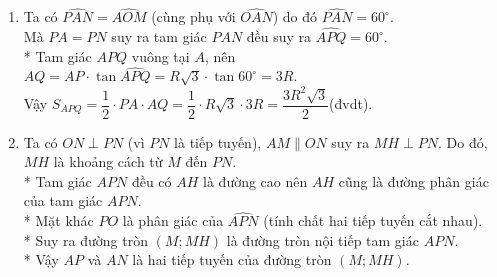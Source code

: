 \begin{bt}
{\begin{enumerate}
			Vậy $AM\parallel ON$.\\*
			Ta có $AP\perp OA$ (vì $AP$ là tiếp tuyến)
			$\Rightarrow \widehat{OAP}=90^\circ$.\\*
			Tam giác $PAO$ vuông tại $A$ nên $AP=OA\cdot
			\tan\widehat{AOP}=R\cdot \tan60^\circ=R\sqrt{3}$.
			\item Ta có $\widehat{PAN}=\widehat{AOM}$ (cùng phụ với $\widehat{OAN}$) do đó $\widehat{PAN}=60^\circ$.\\
			Mà $PA=PN$ suy ra tam giác $PAN$ đều suy ra $\widehat{APQ}=60^\circ$.\\*
			Tam giác $APQ$ vuông tại $A$, nên $AQ=AP\cdot \tan\widehat{APQ}=R\sqrt{3}\cdot \tan60^\circ=3R$.\\
			Vậy $S_{APQ}=\dfrac{1}{2}\cdot PA\cdot AQ=\dfrac{1}{2}\cdot R\sqrt{3}\cdot 3R=\dfrac{3R^{2}\sqrt{3}}{2}$(đvdt).
			\item Ta có $ON\perp PN$ (vì $PN$ là tiếp tuyến), $AM\parallel ON$ suy ra $MH\perp PN$. Do đó, $MH$ là khoảng cách từ $M$ đến $PN$.\\*
			Tam giác $APN$ đều có $AH$ là đường cao nên $AH$ cũng là đường phân giác của tam giác $APN$.\\*
			Mặt khác $PO$ là phân giác của $\widehat{APN}$ (tính chất hai tiếp tuyến cắt nhau).\\*
			Suy ra đường tròn $(M;MH)$ là đường tròn nội tiếp tam giác $APN$.\\*
			Vậy $AP$ và $AN$ là hai tiếp tuyến của đường tròn $(M;MH)$.
		\end{enumerate}
	}
\end{bt}

